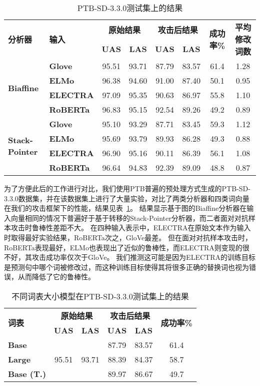 \begin{table}[htbp]
	\centering
	\small
	\renewcommand{\arraystretch}{1.2}
	\begin{tabular}{l|l||cc|cc|c|c}
		\hline
		\multirow{2}{*}{\bf 分析器}&\multirow{2}{*}{\bf 输入}& \multicolumn{2}{c|}{\bf 原始结果} & \multicolumn{2}{c|}{\bf 攻击后结果} & \multirow{2}{*}{\bf 成功率\%} & \multirow{2}{*}{\bf 平均修改词数} \\
		\cline{3-6}
		& & \bf UAS & \bf LAS & \bf UAS & \bf LAS & & \\
		\hline
		\multirow{4}{*}{\bf Biaffine} & \bf Glove &95.51 & 93.71 &87.79 &83.57 &61.4 &1.28 \\
		& \bf ELMo  &96.38 &94.60 &91.00 &87.40 &50.1 &0.95 \\
		& \bf ELECTRA &97.09 & 95.35 &90.63 &86.97 &55.8 &1.10 \\
		& \bf RoBERTa &96.83 & 95.15 &92.54 &89.26 &49.2 &0.89 \\
		\hline
		\hline
		\multirow{4}{*}{\bf Stack-Pointer} & \bf Glove &95.10 & 93.29 &87.71 &83.45 &59.3 &1.12 \\
		& \bf ELMo    &95.69 & 93.79 &89.93 &86.28 &49.3 &0.88 \\
		& \bf ELECTRA &96.90 & 95.16 &90.11 &86.39 &56.1 &1.08 \\
		& \bf RoBERTa &96.64 & 94.83 &92.39 &89.09 &48.8 &0.87 \\
		\hline
	\end{tabular}
	\caption{PTB-SD-3.3.0测试集上的结果} 
	\label{tbl:attack-main}
\end{table}

为了方便此后的工作进行对比，我们使用PTB普遍的预处理方式生成的PTB-SD-3.3.0数据集，并在该数据集上进行了大量实验，对比了两类分析器和四类词向量在我们的攻击框架下的性能，结果见表~\ref{tbl:attack-main}。
结果显示基于图的Biaffine分析器在输入向量相同的情况下普遍好于基于转移的Stack-Pointer分析器，而二者面对对抗样本攻击时鲁棒性差距不大。
在四种输入表示中，ELECTRA在原始文本作为输入时取得最好实验结果，RoBERTa次之，GloVe最差。
但在面对对抗样本攻击时，RoBERTa表现最好，ELMo也表现出了近似的鲁棒性，而ELECTRA则变现的很不好，其攻击成功率仅次于GloVe。
我们推测这可能是因为ELECTRA的训练目标是预测句中哪个词被修改过，而这种训练目标使得其将很多正确的替换词也视为错误，从而降低了它的鲁棒性。


\begin{table}[h]
	\centering
	\small
	\renewcommand{\arraystretch}{1.2}
	\begin{tabular}{l||cc|cc|c}
		\hline
		\multirow{2}{*}{\bf 词表}& \multicolumn{2}{c|}{\bf 原始结果} & \multicolumn{2}{c|}{\bf 攻击后结果} & \multirow{2}{*}{\bf 成功率\%} \\
		\cline{2-5}
		& \bf UAS & \bf LAS & \bf UAS & \bf LAS & \\
		\hline
		\bf Base &\multirow{3}{*}{95.51} & \multirow{3}{*}{93.71} &87.79 &83.57 &61.4 \\
		\bf Large  & & &88.39 &84.37 &58.7 \\
		\bf Base (T.) && &89.97 &86.67 &49.7 \\
		\hline
	\end{tabular}
	\caption{不同词表大小模型在PTB-SD-3.3.0测试集上的结果} 
	\label{tbl:oov-oot-result}
\end{table}

